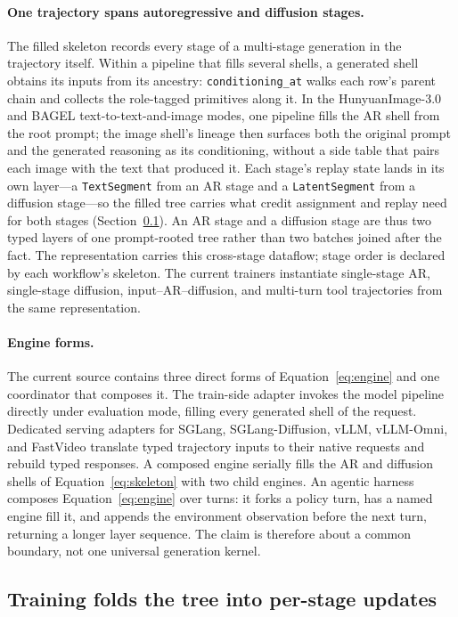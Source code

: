 \documentclass[10pt]{article}
\begin{document}
\paragraph{One trajectory spans autoregressive and diffusion stages.}
The filled skeleton records every stage of a multi-stage generation in the trajectory itself.
Within a pipeline that fills several shells, a generated shell obtains its inputs from its ancestry: \texttt{conditioning\_at} walks each row's parent chain and collects the role-tagged primitives along it.
In the HunyuanImage-3.0 and BAGEL text-to-text-and-image modes, one pipeline fills the AR shell from the root prompt; the image shell's lineage then surfaces both the original prompt and the generated reasoning as its conditioning, without a side table that pairs each image with the text that produced it.
Each stage's replay state lands in its own layer---a \texttt{TextSegment} from an AR stage and a \texttt{LatentSegment} from a diffusion stage---so the filled tree carries what credit assignment and replay need for both stages (Section~\ref{sec:fold}).
An AR stage and a diffusion stage are thus two typed layers of one prompt-rooted tree rather than two batches joined after the fact.
The representation carries this cross-stage dataflow; stage order is declared by each workflow's skeleton.
The current trainers instantiate single-stage AR, single-stage diffusion, input--AR--diffusion, and multi-turn tool trajectories from the same representation.

\paragraph{Engine forms.}
The current source contains three direct forms of Equation~\ref{eq:engine} and one coordinator that composes it.
The train-side adapter invokes the model pipeline directly under evaluation mode, filling every generated shell of the request.
Dedicated serving adapters for SGLang, SGLang-Diffusion, vLLM, vLLM-Omni, and FastVideo translate typed trajectory inputs to their native requests and rebuild typed responses.
A composed engine serially fills the AR and diffusion shells of Equation~\ref{eq:skeleton} with two child engines.
An agentic harness composes Equation~\ref{eq:engine} over turns: it forks a policy turn, has a named engine fill it, and appends the environment observation before the next turn, returning a longer layer sequence.
The claim is therefore about a common boundary, not one universal generation kernel.

\subsection{Training folds the tree into per-stage updates}
\label{sec:fold}
\end{document}
